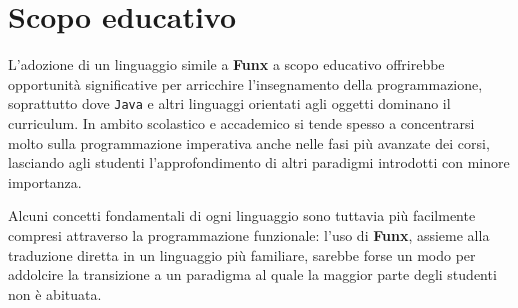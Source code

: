 \section{Scopo educativo}
\label{sec:6-3-educational-purpose}

L'adozione di un linguaggio simile a \textbf{Funx} a scopo educativo offrirebbe opportunità significative
per arricchire l'insegnamento della programmazione, soprattutto dove \texttt{Java} e altri linguaggi
orientati agli oggetti dominano il curriculum. In ambito scolastico e accademico si tende spesso a concentrarsi
molto sulla programmazione imperativa anche nelle fasi più avanzate dei corsi,
lasciando agli studenti l'approfondimento di altri paradigmi introdotti con minore importanza.

Alcuni concetti fondamentali di ogni linguaggio sono tuttavia più facilmente compresi attraverso la programmazione funzionale:
l'uso di \textbf{Funx}, assieme alla traduzione diretta in un linguaggio più familiare, sarebbe forse un modo per addolcire
la transizione a un paradigma al quale la maggior parte degli studenti non è abituata.